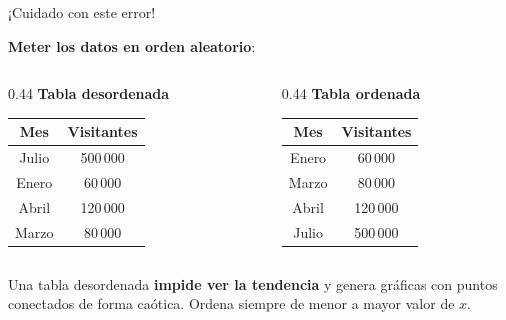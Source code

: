\documentclass[aspectratio=169, 10pt, spanish]{beamer}
\begin{document}
\begin{frame}{¡Cuidado con este error!}
  \begin{errorbox}
    \textbf{Meter los datos en orden aleatorio}:

    \vspace{0.3cm}
    \begin{columns}[T]
      \begin{column}{0.44\textwidth}
        \incorrecto\; \textbf{Tabla desordenada}
        \vspace{4pt}
        \AlmFontSmall
        \begin{tabular}{cc}
          \toprule
          \rowcolor{AlmTerra!10}
          Mes & Visitantes \\
          \midrule
          Julio & 500\,000 \\
          Enero & 60\,000 \\
          Abril & 120\,000 \\
          Marzo & 80\,000 \\
          \bottomrule
        \end{tabular}
      \end{column}
      \begin{column}{0.44\textwidth}
        \correcto\; \textbf{Tabla ordenada}
        \vspace{4pt}
        \AlmFontSmall
        \begin{tabular}{cc}
          \toprule
          \rowcolor{AlmVerde!10}
          Mes & Visitantes \\
          \midrule
          Enero & 60\,000 \\
          Marzo & 80\,000 \\
          Abril & 120\,000 \\
          Julio & 500\,000 \\
          \bottomrule
        \end{tabular}
      \end{column}
    \end{columns}

    \vspace{0.25cm}
    \AlmFontSmall
    Una tabla desordenada \textbf{impide ver la tendencia} y genera gráficas
    con puntos conectados de forma caótica.
    Ordena siempre de menor a mayor valor de \(x\).
  \end{errorbox}
\end{frame}
\end{document}
